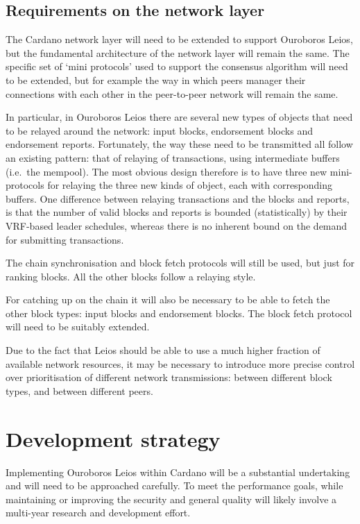\documentclass[11pt,a4paper]{article}
\begin{document}
\subsection{Requirements on the network layer}

The Cardano network layer will need to be extended to support Ouroboros Leios,
but the fundamental architecture of the network layer will remain the same.
The specific set of `mini protocols' used to support the consensus algorithm
will need to be extended, but for example the way in which peers manager their
connections with each other in the peer-to-peer network will remain the same.

In particular, in Ouroboros Leios there are several new types of objects that
need to be relayed around the network: input blocks, endorsement blocks and
endorsement reports. Fortunately, the way these need to be transmitted all
follow an existing pattern: that of relaying of transactions, using
intermediate buffers (i.e.~the mempool). The most obvious design therefore is
to have three new mini-protocols for relaying the three new kinds of object,
each with corresponding buffers. One difference between relaying transactions
and the blocks and reports, is that the number of valid blocks and reports is
bounded (statistically) by their VRF-based leader schedules, whereas there is
no inherent bound on the demand for submitting transactions.

The chain synchronisation and block fetch protocols will still be used, but
just for ranking blocks. All the other blocks follow a relaying style.

For catching up on the chain it will also be necessary to be able to fetch
the other block types: input blocks and endorsement blocks. The block fetch
protocol will need to be suitably extended.

Due to the fact that Leios should be able to use a much higher fraction of
available network resources, it may be necessary to introduce more precise
control over prioritisation of different network transmissions: between
different block types, and between different peers.

\section{Development strategy}

Implementing Ouroboros Leios within Cardano will be a substantial undertaking
and will need to be approached carefully. To meet the performance goals, while
maintaining or improving the security and general quality will likely involve
a multi-year research and development effort.
\end{document}
